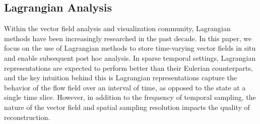 \setlength{\belowdisplayskip}{3pt} \setlength{\belowdisplayshortskip}{3pt}
\setlength{\abovedisplayskip}{3pt} \setlength{\abovedisplayshortskip}{3pt}


\vspace{-1mm}
\subsection{Lagrangian Analysis}
Within the vector field analysis and visualization community, Lagrangian methods have been increasingly researched in the past decade. 
%
In this paper, we focus on the use of Lagrangian methods to store time-varying vector fields in situ and enable subsequent post hoc analysis.
%
%
In sparse temporal settings, Lagrangian representations are expected to perform better than their Eulerian counterparts, and the key intuition behind this is Lagrangian representations capture the behavior of the flow field over an interval of time, as opposed to the state at a single time slice.
%
However, in addition to the frequency of temporal sampling, the nature of the vector field and spatial sampling resolution impacts the quality of reconstruction.
%


